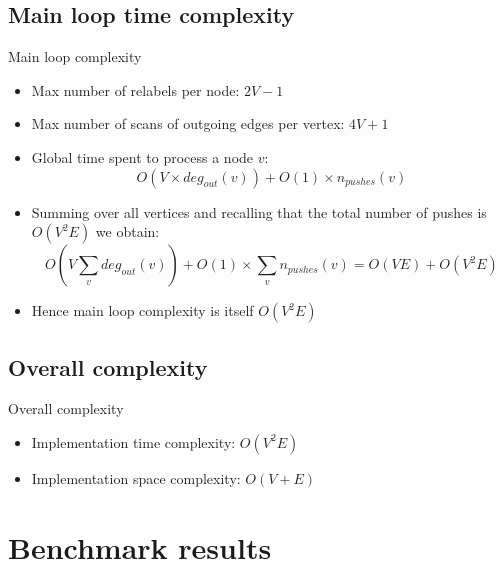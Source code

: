 \documentclass{beamer}
\begin{document}
\subsection{Main loop time complexity}
\begin{frame}[fragile]{Main loop complexity}
    \begin{itemize}
        \item Max number of relabels per node: $2V-1$
        \pause
        \item Max number of scans of outgoing edges per vertex: $4V+1$
        \pause
        \item Global time spent to process a node $v$:
              $$O(V\times deg_{out}(v))+O(1)\times n_{pushes}(v)$$
        \pause
        \item Summing over all vertices and recalling that the total number of pushes is $O(V^{2}E)$ we obtain:
              $$O(V \sum_{v} deg_{out}(v)) + O(1) \times \sum_{v} n_{pushes}(v) = O(VE) + O(V^{2}E)$$
        \pause
        \item Hence main loop complexity is itself $O(V^{2}E)$
    \end{itemize}
\end{frame}

\subsection{Overall complexity}
\begin{frame}[fragile]{Overall complexity}
    \begin{itemize}
        \setlength\itemsep{30bp}
        \item Implementation time complexity: $O(V^{2}E)$
        \pause
        \item Implementation space complexity: $O(V+E)$
    \end{itemize}
\end{frame}

\section{Benchmark results}
\end{document}
